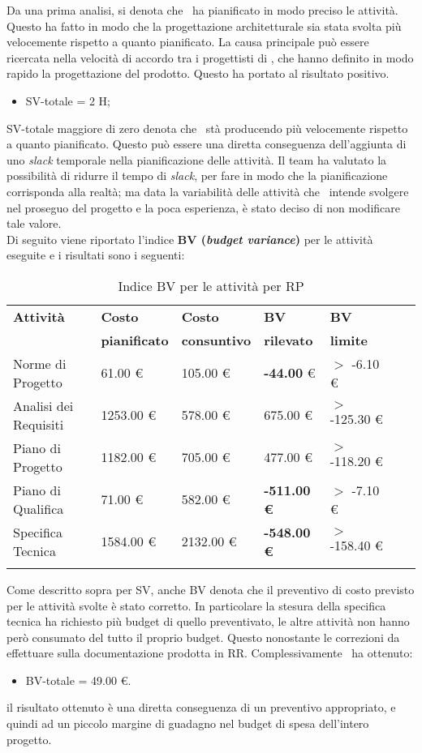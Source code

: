Da una prima analisi, si denota che \gruppo ~ha pianificato in modo preciso le attività.
Questo ha fatto in modo che la progettazione architetturale sia stata svolta più velocemente rispetto a quanto pianificato. La causa principale può essere ricercata nella velocità di accordo tra i progettisti di \gruppo, che hanno definito in modo rapido la progettazione del prodotto. Questo ha portato al risultato positivo.
\begin{itemize}
\item SV-totale = 2 H;
\end{itemize}
SV-totale maggiore di zero denota che \gruppo ~stà producendo più velocemente rispetto a quanto pianificato. Questo può essere una diretta conseguenza dell'aggiunta di uno \textit{slack} temporale nella pianificazione delle attività.
Il team ha valutato la possibilità di ridurre il tempo di \textit{slack}, per fare in modo che la pianificazione corrisponda alla realtà; ma data la variabilità delle attività che \gruppo ~intende svolgere nel proseguo del progetto e la poca esperienza, è stato deciso di non modificare tale valore.\\
Di seguito viene riportato l'indice \textbf{BV (\textit{budget variance})} per le attività eseguite e i risultati sono i seguenti:
\begin{longtable}{lllllXr}
\toprule
\textbf{Attività} & \textbf{Costo} & \textbf{Costo} & \textbf{BV} & \textbf{BV} \\
& \textbf{pianificato} & \textbf{consuntivo} & \textbf{rilevato} & \textbf{limite}\\
\toprule
Norme di Progetto & 61.00 € & 105.00 € & \textbf{-44.00} € & $>$ -6.10 €\\
\midrule
Analisi dei Requisiti & 1253.00 € & 578.00 € & 675.00 € & $>$ -125.30 €\\
\midrule
Piano di Progetto & 1182.00 € & 705.00 € & 477.00 € & $>$ -118.20 €\\
\midrule
Piano di Qualifica & 71.00 € & 582.00 € & \textbf{-511.00 €} & $>$ -7.10 €\\
\midrule
Specifica Tecnica & 1584.00 € & 2132.00 € & \textbf{-548.00 €} & $>$ -158.40 €\\
\bottomrule
\caption{Indice BV per le attività per RP}
\end{longtable}
Come descritto sopra per SV, anche BV denota che il preventivo di costo previsto per le attività svolte è stato corretto.
In particolare la stesura della specifica tecnica ha richiesto più budget di quello preventivato, le altre attività non hanno però consumato del tutto il proprio budget. Questo nonostante le correzioni da effettuare sulla documentazione prodotta in RR.
Complessivamente \gruppo ~ha ottenuto:
\begin{itemize}
\item BV-totale = 49.00 €.
\end{itemize}
il risultato ottenuto è una diretta conseguenza di un preventivo appropriato, e quindi ad un piccolo margine di guadagno nel budget di spesa dell'intero progetto.
